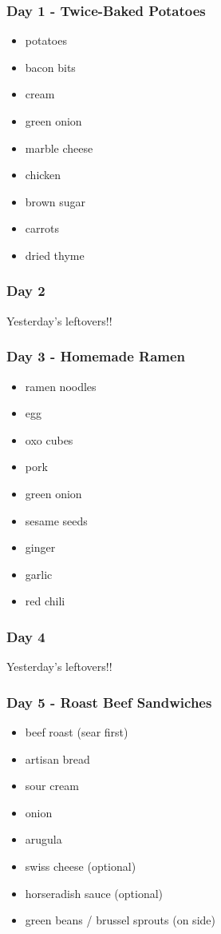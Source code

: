 \documentclass[11pt, a4paper]{article}
\begin{document}
\subsubsection{Day 1 - Twice-Baked Potatoes}
\vspace{1pc}
\begin{itemize}
\item potatoes
\item bacon bits
\item cream
\item green onion
\item marble cheese
\item chicken
\item brown sugar
\item carrots
\item dried thyme
\end{itemize}

\subsubsection{Day 2}
\vspace{1pc}
Yesterday's leftovers!!

\subsubsection{Day 3 - Homemade Ramen}
\vspace{1pc}
\begin{itemize}
\item ramen noodles
\item egg
\item oxo cubes
\item pork
\item green onion
\item sesame seeds
\item ginger
\item garlic
\item red chili
\end{itemize}

\subsubsection{Day 4}
\vspace{1pc}
Yesterday's leftovers!!

\subsubsection{Day 5 - Roast Beef Sandwiches}
\vspace{1pc}
\begin{itemize}
\item beef roast (sear first)
\item artisan bread
\item sour cream
\item onion
\item arugula
\item swiss cheese (optional)
\item horseradish sauce (optional)
\item green beans / brussel sprouts (on side)
\end{itemize}
\end{document}
